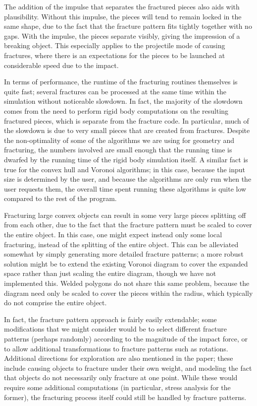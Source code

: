 \documentclass[tog]{acmsiggraph}
\begin{document}
The addition of the impulse that separates the fractured pieces also
aids with plausibility. Without this impulse, the pieces will tend to
remain locked in the same shape, due to the fact that the fracture
pattern fits tightly together with no gaps. With the impulse, the
pieces separate visibly, giving the impression of a breaking
object. This especially applies to the projectile mode of causing
fractures, where there is an expectations for the pieces to be
launched at considerable speed due to the impact.

In terms of performance, the runtime of the fracturing routines
themselves is quite fast; several fractures can be processed at the
same time within the simulation without noticeable slowdown. In fact,
the majority of the slowdown comes from the need to perform rigid body
computations on the resulting fractured pieces, which is separate from
the fracture code. In particular, much of the slowdown is due to very
small pieces that are created from fractures. Despite the
non-optimality of some of the algorithms we are using for geometry and
fracturing, the numbers involved are small enough that the running
time is dwarfed by the running time of the rigid body simulation
itself. A similar fact is true for the convex hull and Voronoi
algorithms; in this case, because the input size is determined by the
user, and because the algorithms are only run when the user requests
them, the overall time spent running these algorithms is quite low
compared to the rest of the program.

Fracturing large convex objects can result in some very large pieces
splitting off from each other, due to the fact that the fracture
pattern must be scaled to cover the entire object. In this case, one
might expect instead only some local fracturing, instead of the
splitting of the entire object. This can be alleviated somewhat by
simply generating more detailed fracture patterns; a more robust
solution might be to extend the existing Voronoi diagram to cover the
expanded space rather than just scaling the entire diagram, though we
have not implemented this. Welded polygons do not share this same
problem, because the diagram need only be scaled to cover the pieces
within the radius, which typically do not comprise the entire object.

In fact, the fracture pattern approach is fairly easily extendable;
some modifications that we might consider would be to select different
fracture patterns (perhaps randomly) according to the magnitude of the
impact force, or to allow additional transformations to fracture
patterns such as rotations. Additional directions for exploration are
also mentioned in the paper; these include causing objects to fracture
under their own weight, and modeling the fact that objects do not
necessarily only fracture at one point. While these would require some
additional computations (in particular, stress analysis for the
former), the fracturing process itself could still be handled by
fracture patterns.
\end{document}
